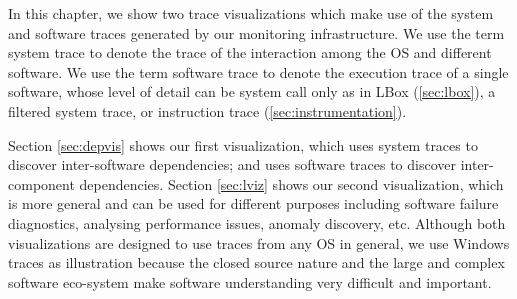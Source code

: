 
In this chapter, we show two trace visualizations which make use
of the system and software traces generated by our monitoring infrastructure.
We use the term system trace to denote the trace of the interaction
among the OS and different software.
We use the term software trace to denote the execution trace of a single
software, whose level of detail can be system call only as in LBox
(\autoref{sec:lbox}), a filtered system trace, or
instruction trace (\autoref{sec:instrumentation}).

Section \ref{sec:depvis} shows our first visualization, which
uses system traces to discover inter-software
dependencies; and uses software traces to
discover inter-component dependencies.
Section \ref{sec:lviz} shows our second visualization, which
is more general and can be used for different
purposes including software failure diagnostics, analysing performance
issues, anomaly discovery, etc.
Although both visualizations are designed to use traces from any OS in general,
we use Windows traces as illustration because
the closed source nature and the large and complex software eco-system make
software understanding very difficult and important.
